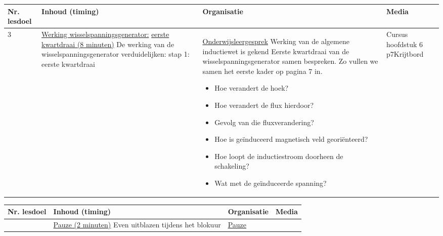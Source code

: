 \begin{landscape}
\begin{tabularx}{1.56\textwidth}{|p{1.5cm}|p{6.5cm}|X|p{4cm}|}
	\hline
	\textbf{Nr. lesdoel } & \textbf{Inhoud (timing)}  & \textbf{Organisatie } & \textbf{Media } \\ \hline
	3& \underline{Werking wisselspanningsgenerator:} \underline{eerste kwartdraai (8 minuten)}\newline
	De werking van de wisselspanningsgenerator verduidelijken: stap 1: eerste kwartdraai
	&  \underline{Onderwijsleergesprek}\newline  
	Werking van de algemene inductiewet is gekend\newline
	Eerste kwartdraai van de wisselspanningsgenerator samen bespreken. Zo vullen we samen het eerste kader op pagina 7 in.\newline
	\begin{itemize}
		\item Hoe verandert de hoek?
		\item Hoe verandert de flux hierdoor?
		\item Gevolg van die fluxverandering?
		\item Hoe is geïnduceerd magnetisch veld georiënteerd?
		\item Hoe loopt de inductiestroom doorheen de schakeling?
		\item Wat met de geïnduceerde spanning?
	\end{itemize}
	&  Cursus hoofdstuk 6 p7\newline\newline Krijtbord
	\\ \hline
\end{tabularx}\vspace{5mm}


\begin{tabularx}{1.56\textwidth}{|p{1.5cm}|p{6.5cm}|X|p{3cm}|}
	\hline
	\textbf{Nr. lesdoel } & \textbf{Inhoud (timing)}  & \textbf{Organisatie } & \textbf{Media } \\ \hline
	& \underline{Pauze (2 minuten)}\newline
	Even uitblazen tijdens het blokuur
	&  \underline{Pauze}\newline 
	&  
	\\ \hline
\end{tabularx}\vspace{5mm}



\end{landscape}

